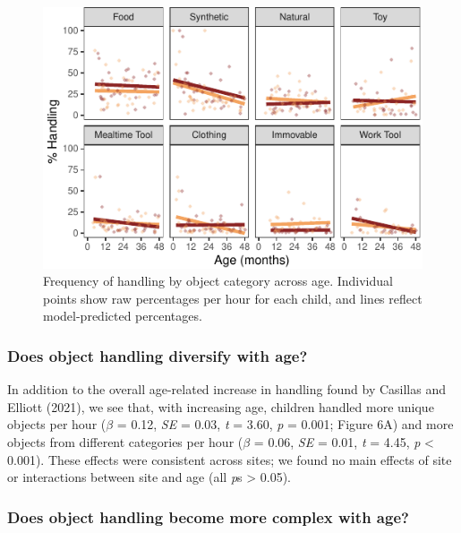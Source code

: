 \documentclass[10pt, letterpaper]{article}
\newenvironment{CodeChunk}{}{}
\begin{document}
\begin{CodeChunk}
\begin{figure}[!ht]

{\centering \includegraphics{figs/age-effects-bycategory-fig-1} 

}

\caption[Frequency of handling by object category across age]{Frequency of handling by object category across age. Individual points show raw percentages per hour for each child, and lines reflect model-predicted percentages.}\label{fig:age-effects-bycategory-fig}
\end{figure}
\end{CodeChunk}

\hypertarget{does-object-handling-diversify-with-age}{%
\subsubsection{Does object handling diversify with
age?}\label{does-object-handling-diversify-with-age}}

In addition to the overall age-related increase in handling found by
Casillas and Elliott (2021), we see that, with increasing age, children
handled more unique objects per hour (\(\beta\) = 0.12, \emph{SE} =
0.03, \emph{t} = 3.60, \emph{p} = 0.001; Figure 6A) and more objects
from different categories per hour (\(\beta\) = 0.06, \emph{SE} = 0.01,
\emph{t} = 4.45, \emph{p} \textless{} 0.001). These effects were
consistent across sites; we found no main effects of site or
interactions between site and age (all \emph{p}s \textgreater{} 0.05).

\hypertarget{does-object-handling-become-more-complex-with-age}{%
\subsubsection{Does object handling become more complex with
age?}\label{does-object-handling-become-more-complex-with-age}}
\end{document}
